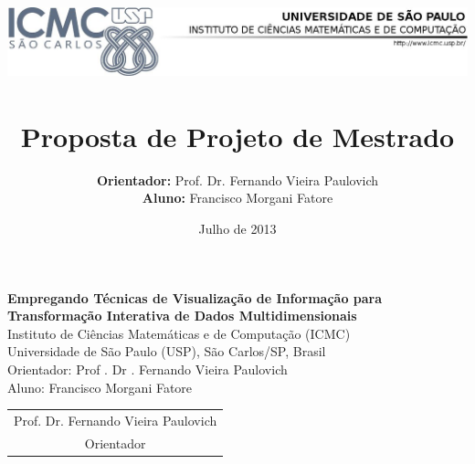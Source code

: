 \documentclass[brazil, a4paper, 11pt, titlepage]{article}
\title{
  \vspace{-4.5cm}
  \includegraphics[width=15cm]{images/logo.png}\\
  \vspace{6cm}
  \renewcommand{\baselinestretch}{1.75}{%
    \huge \doctitle}
  \vspace{2cm}
  \Large \\
  Proposta de Projeto de Mestrado \\
}
\author{
  \textbf{Orientador:} Prof. Dr. Fernando Vieira Paulovich\\
  \textbf{Aluno:} Francisco Morgani Fatore\\
}
\date{Julho de 2013}
\newcommand{\doctitle}{Empregando Técnicas de Visualização
de Informação para Transformação Interativa de Dados
Multidimensionais}
\renewcommand{\baselinestretch}{1.75}{%
    \huge \doctitle}
\renewcommand{\baselinestretch}{1.5} %
\begin{document}
\maketitle

\clearpage
\thispagestyle{empty}

\begin{center}
  \renewcommand{\baselinestretch}{1.0}{
    \large{\textbf{\doctitle}\\
    \huge }
    \vspace{1.5cm}
    \normalsize{Instituto de Ciências Matemáticas e de Computação (ICMC)\\
    Universidade de São Paulo (USP), São Carlos/SP, Brasil}\\
    \vspace{1cm}
    \normalsize{Orientador: Prof . Dr . Fernando Vieira Paulovich\\
    Aluno: Francisco Morgani Fatore}
  }
  \vspace{1cm}
\end{center}


% 

\clearpage

\thispagestyle{empty}
\clearpage

\setcounter{page}{1}


\clearpage

\clearpage

\clearpage


\clearpage
\printbibliography

\vspace{1.5cm}
\begin{table}[htb]
  \centering
  \begin{tabular}{c}
    \hline
    Prof. Dr. Fernando Vieira Paulovich\\
    Orientador
  \end{tabular} 
\end{table}
\end{document}
